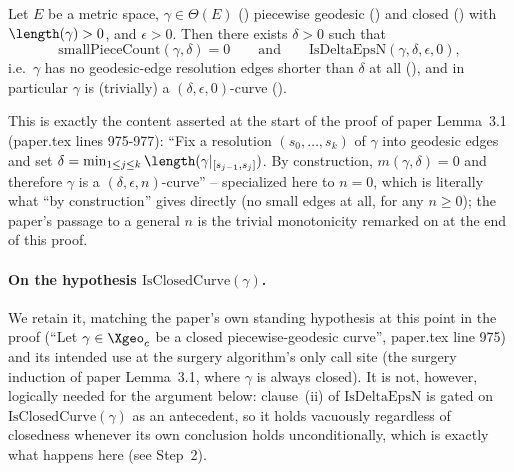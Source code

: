 \begin{lemma}
  Let $E$ be a metric space, $\gamma \in \Theta(E)$ () piecewise geodesic
  () and closed () with $\length(\gamma) > 0$,
  and $\epsilon > 0$. Then there exists $\delta > 0$ such that
  \[
    \mathrm{smallPieceCount}(\gamma,\delta) = 0
    \qquad\text{and}\qquad
    \mathrm{IsDeltaEpsN}(\gamma,\delta,\epsilon,0)
    ,
  \]
  i.e.\ $\gamma$ has no geodesic-edge resolution edges shorter than $\delta$ at all
  (), and in particular $\gamma$ is (trivially) a $(\delta,\epsilon,0)$-curve
  ().

  This is exactly the content asserted at the start of the proof of paper Lemma~3.1 (paper.tex
  lines 975-977): ``Fix a resolution $(s_0,\dots,s_k)$ of $\gamma$ into geodesic edges and set
  $\delta = \min_{1\le j\le k} \length(\gamma|_{[s_{j-1},s_j]})$. By construction, $m(\gamma,\delta)=0$
  and therefore $\gamma$ is a $(\delta,\epsilon,n)$-curve'' -- specialized here to $n=0$, which is
  literally what ``by construction'' gives directly (no small edges at all, for any $n \ge 0$); the
  paper's passage to a general $n$ is the trivial monotonicity remarked on at the end of this proof.

  \paragraph{On the hypothesis $\mathrm{IsClosedCurve}(\gamma)$.} We retain it, matching the paper's
  own standing hypothesis at this point in the proof (``Let $\gamma \in \Xgeo_c$ be a closed
  piecewise-geodesic curve'', paper.tex line 975) and its intended use at the surgery algorithm's
  only call site (the surgery induction of paper Lemma~3.1, where $\gamma$ is always closed). It is
  not, however, logically needed
  for the argument below: clause~(ii) of $\mathrm{IsDeltaEpsN}$ is gated on
  $\mathrm{IsClosedCurve}(\gamma)$ as an antecedent, so it holds vacuously regardless of closedness
  whenever its own conclusion holds unconditionally, which is exactly what happens here (see Step~2).
\end{lemma}
